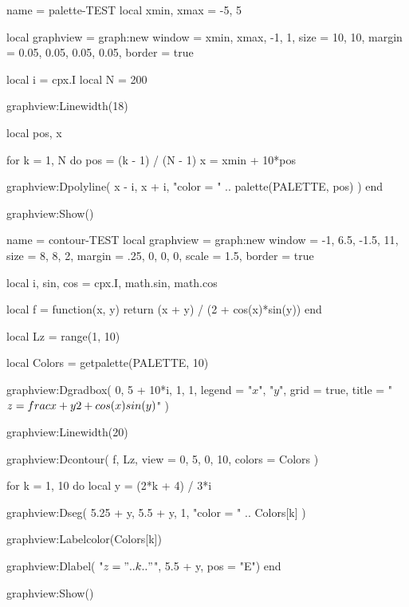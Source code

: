 \centering

\begin{luadraw}{name = palette-TEST}
local xmin, xmax = -5, 5

local graphview = graph:new{
  window = {xmin, xmax, -1, 1},
  size   = {10, 10},
  margin = {0.05, 0.05, 0.05, 0.05},
  border = true
}

local i = cpx.I
local N = 200

graphview:Linewidth(18)

local pos, x

for k = 1, N do
  pos = (k - 1) / (N - 1)
  x   = xmin + 10*pos

  graphview:Dpolyline(
    {x - i, x + i},
    "color = " .. palette(PALETTE, pos)
  )
end

graphview:Show()
\end{luadraw}


\bigskip


\begin{luadraw}{name = contour-TEST}
local graphview = graph:new{
  window = {-1, 6.5, -1.5, 11},
  size   = {8, 8, 2},
  margin = {.25, 0, 0, 0},
  scale  = 1.5,
  border = true
}

local i, sin, cos = cpx.I, math.sin, math.cos

local f = function(x, y) return (x + y) / (2 + cos(x)*sin(y)) end

local Lz = range(1, 10)

local Colors = getpalette(PALETTE, 10)

graphview:Dgradbox(
  {0, 5 + 10*i, 1, 1},
  {
    legend = {"$x$", "$y$"},
    grid   = true,
    title  = "$z = \\frac{x + y}{2 + \\cos(x) \\sin(y)}$"
  })

graphview:Linewidth(20)

graphview:Dcontour(
  f,
  Lz,
  {
    view   = {0, 5, 0, 10},
    colors = Colors
  })

for k = 1, 10 do
  local y = (2*k + 4) / 3*i

  graphview:Dseg(
    {5.25 + y, 5.5 + y},
    1,
    "color = " .. Colors[k]
  )

  graphview:Labelcolor(Colors[k])

  graphview:Dlabel(
    "$z = " .. k .. "$",
    5.5 + y,
    {pos = "E"})
end

graphview:Show()
\end{luadraw}


\bigskip


